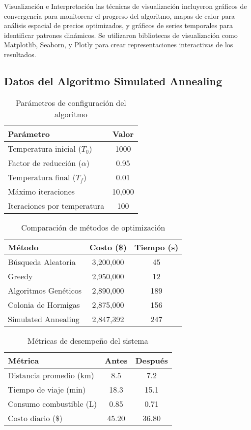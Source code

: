 \documentclass[12pt,a4paper,twocolumn]{article}
\begin{document}
Visualización e Interpretación las técnicas de visualización incluyeron gráficos de convergencia para monitorear el progreso del algoritmo, mapas de calor para análisis espacial de precios optimizados, y gráficos de series temporales para identificar patrones dinámicos. Se utilizaron bibliotecas de visualización como Matplotlib, Seaborn, y Plotly para crear representaciones interactivas de los resultados.
\subsection{Datos del Algoritmo Simulated Annealing}

\begin{table}[h!]
\centering
\caption{Parámetros de configuración del algoritmo}
\begin{tabular}{@{}lc@{}}
\toprule
\textbf{Parámetro} & \textbf{Valor} \\
\midrule
Temperatura inicial ($T_0$) & 1000 \\
Factor de reducción ($\alpha$) & 0.95 \\
Temperatura final ($T_f$) & 0.01 \\
Máximo iteraciones & 10,000 \\
Iteraciones por temperatura & 100 \\
\bottomrule
\end{tabular}
\end{table}

\begin{table}[h!]
\centering
\caption{Comparación de métodos de optimización}
\begin{tabular}{@{}lcc@{}}
\toprule
\textbf{Método} & \textbf{Costo (\$)} & \textbf{Tiempo (s)} \\
\midrule
Búsqueda Aleatoria & 3,200,000 & 45 \\
Greedy & 2,950,000 & 12 \\
Algoritmos Genéticos & 2,890,000 & 189 \\
Colonia de Hormigas & 2,875,000 & 156 \\
Simulated Annealing & 2,847,392 & 247 \\
\bottomrule
\end{tabular}
\end{table}

\begin{table}[h!]
\centering
\caption{Métricas de desempeño del sistema}
\begin{tabular}{@{}lcc@{}}
\toprule
\textbf{Métrica} & \textbf{Antes} & \textbf{Después} \\
\midrule
Distancia promedio (km) & 8.5 & 7.2 \\
Tiempo de viaje (min) & 18.3 & 15.1 \\
Consumo combustible (L) & 0.85 & 0.71 \\
Costo diario (\$) & 45.20 & 36.80 \\
\bottomrule
\end{tabular}
\end{table}
\end{document}
